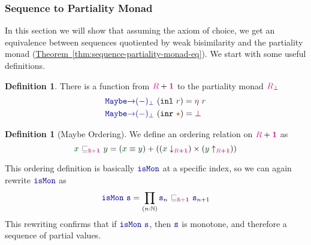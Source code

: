 \documentclass[twoside,11pt,openright]{report}
\theoremstyle{plain} %
\theoremstyle{definition}
\newtheorem{defn}[thm]{Definition}%
\theoremstyle{remark}
\newcommand*{\thmref}[1]{\hyperref[thm:#1]{Theorem~\ref*{thm:#1}}} %
\newcommand*{\term}[1]{\textcolor{green!30!black}{#1}} %
\newcommand*{\type}[1]{\textcolor{magenta!90!black}{#1}}
\newcommand*{\unit}{\type{\textbf{1}}}
\newcommand*{\relation}[1]{\textcolor{gray!75!black}{\ensuremath{\mathtt{#1}}}}
\newcommand*{\constant}[1]{\textcolor{orange!60!black}{\ensuremath{\mathtt{#1}}}}
\newcommand*{\function}[1]{\textcolor{blue!60!black}{\ensuremath{\mathtt{#1}}}}
\newcommand*{\constructor}[1]{\textcolor{purple!60!black}{\ensuremath{\mathtt{#1}}}}
\newcommand*{\unitelem}{\constant{\star}} %
\begin{document}
\subsubsection{Sequence to Partiality Monad}
\label{sec:sequences-to-partiality-monad}
In this section we will show that assuming the axiom of choice, we get an equivalence between sequences quotiented by weak bisimilarity and the partiality monad (\thmref{sequence-partiality-monad-eq}). We start with some useful definitions.
\begin{defn} There is a function from \(\type{R} + \unit\) to the partiality monad \(\type{R}_\bot\)
  \begin{equation}
    \begin{aligned}
      &\function{Maybe{\rightarrow}(-)_\bot}~(\mathtt{inl}~\term{r}) = \constructor{\eta}~\term{r} \\
      &\function{Maybe{\rightarrow}(-)_\bot}~(\mathtt{inr}~\unitelem) = \constructor{\bot}
    \end{aligned}
  \end{equation}
\end{defn}
\begin{defn}[Maybe Ordering]
  \label{eq:maybe-order}
  We define an ordering relation on \(\type{R} + \unit\) as 
  \begin{equation}
    \term{x}~\relation{\sqsubseteq_{\type{R} + \unit}}~\term{y} = (\term{x} \equiv \term{y}) + ((\term{x}  \downarrow_{\type{R} + \unit}) \times (\term{y} \uparrow_{\type{R} + \unit}))
  \end{equation}
\end{defn}
\noindent This ordering definition is basically \(\function{isMon}\) at a specific index, so we can again rewrite \(\function{isMon}\) as
\begin{equation}
  \function{isMon}~\function{s} = \prod_{(n : \mathbb{N})} \function{s}_n~\relation{\sqsubseteq_{\type{R} + \unit}}~\function{s}_{n+1}
\end{equation}
This rewriting confirms that if \(\function{isMon}~\function{s}\), then \(\function{s}\) is monotone, and therefore a sequence of partial values.
\end{document}
